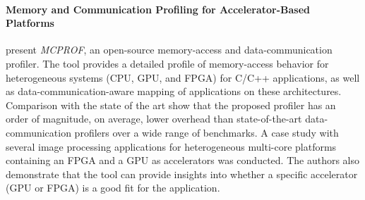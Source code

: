 \paragraph{Memory and Communication Profiling for Accelerator-Based Platforms}
\citet{Ashraf2018MemoryPlatforms} present \emph{MCPROF}, an open-source memory-access and data-communication profiler. The tool provides a detailed profile of memory-access behavior for heterogeneous systems (CPU, GPU, and FPGA) for C/C++ applications, as well as data-communication-aware mapping of applications on these architectures. Comparison with the state of the art show that the proposed profiler has an order of magnitude, on average, lower overhead than state-of-the-art data-communication profilers over a wide range of benchmarks. A case study  with several image processing applications for heterogeneous multi-core platforms containing an FPGA and a GPU as accelerators was conducted. The authors also demonstrate that the tool can provide insights into whether %
a specific %
accelerator (GPU or FPGA) is a good fit 
for the application.

